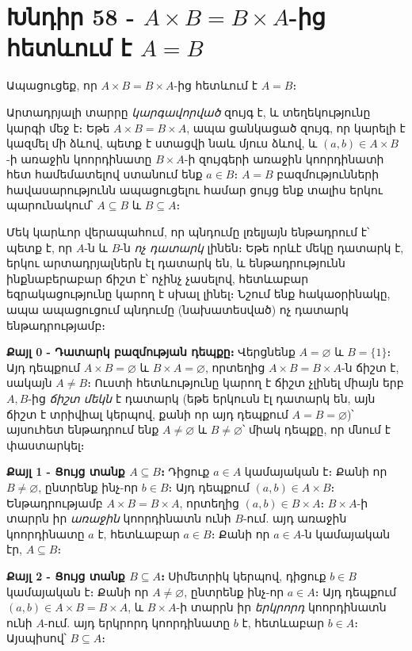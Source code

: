 \documentclass[11pt,a4paper]{article}
\begin{document}
\section*{Խնդիր 58 - $A\times B=B\times A$-ից հետևում է $A=B$}

\begin{problembox}[58]
Ապացուցեք, որ $A\times B=B\times A$-ից հետևում է $A=B$։
\end{problembox}

\begin{ideabox}
Արտադրյալի տարրը \emph{կարգավորված} զույգ է, և տեղեկությունը կարգի մեջ է։ Եթե
$A\times B=B\times A$, ապա ցանկացած զույգ, որ կարելի է կազմել մի ձևով, պետք է ստացվի նաև մյուս
ձևով, և $(a,b)\in A\times B$-ի առաջին կոորդինատը $B\times A$-ի զույգերի առաջին կոորդինատի հետ
համեմատելով ստանում ենք $a\in B$։ $A=B$ բազմությունների հավասարությունն ապացուցելու համար ցույց ենք
տալիս երկու պարունակում՝ $A\subseteq B$ և $B\subseteq A$։

Մեկ կարևոր վերապահում, որ պնդումը լռելյայն ենթադրում է՝ պետք է, որ $A$-ն և $B$-ն \emph{ոչ դատարկ} լինեն։ Եթե որևէ
մեկը դատարկ է, երկու արտադրյալներն էլ դատարկ են, և ենթադրությունն ինքնաբերաբար ճիշտ է՝ ոչինչ չասելով,
հետևաբար եզրակացությունը կարող է սխալ լինել։ Նշում ենք հակաօրինակը, ապա ապացուցում պնդումը (նախատեսված) ոչ դատարկ ենթադրությամբ։
\end{ideabox}

\textbf{Քայլ 0 - Դատարկ բազմության դեպքը։}
Վերցնենք $A=\varnothing$ և $B=\{1\}$։ Այդ դեպքում $A\times B=\varnothing$ և $B\times A=\varnothing$, որտեղից
$A\times B=B\times A$-ն ճիշտ է, սակայն $A\neq B$։ Ուստի հետևությունը կարող է ճիշտ չլինել միայն երբ $A,B$-ից
\emph{ճիշտ մեկն} է դատարկ (եթե երկուսն էլ դատարկ են, այն ճիշտ է տրիվիալ կերպով, քանի որ այդ դեպքում
$A=B=\varnothing$)՝ այսուհետ ենթադրում ենք $A\neq\varnothing$ և $B\neq\varnothing$՝ միակ դեպքը, որ մնում
է փաստարկել։

\textbf{Քայլ 1 - Ցույց տանք $A\subseteq B$։}
Դիցուք $a\in A$ կամայական է։ Քանի որ $B\neq\varnothing$, ընտրենք ինչ-որ $b\in B$։ Այդ դեպքում
$(a,b)\in A\times B$։ Ենթադրությամբ $A\times B=B\times A$, որտեղից $(a,b)\in B\times A$։ $B\times A$-ի
տարրն իր \emph{առաջին} կոորդինատն ունի $B$-ում. այդ առաջին կոորդինատը $a$ է, հետևաբար $a\in B$։ Քանի որ
$a\in A$-ն կամայական էր, $A\subseteq B$։

\textbf{Քայլ 2 - Ցույց տանք $B\subseteq A$։}
Սիմետրիկ կերպով, դիցուք $b\in B$ կամայական է։ Քանի որ $A\neq\varnothing$, ընտրենք ինչ-որ $a\in A$։ Այդ
դեպքում $(a,b)\in A\times B=B\times A$, և $B\times A$-ի տարրն իր \emph{երկրորդ} կոորդինատն ունի $A$-ում.
այդ երկրորդ կոորդինատը $b$ է, հետևաբար $b\in A$։ Այսպիսով՝ $B\subseteq A$։
\end{document}
